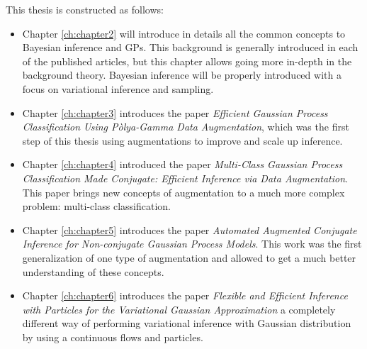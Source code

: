 This thesis is constructed as follows:
\begin{itemize}
    \item Chapter \ref{ch:chapter2} will introduce in details all the common concepts to Bayesian inference and \ac{GPs}.
          This background is generally introduced in each of the published articles, but this chapter allows going more in-depth in the background theory.
          Bayesian inference will be properly introduced with a focus on variational inference and sampling.
    \item Chapter \ref{ch:chapter3} introduces the paper \textit{Efficient Gaussian Process Classification Using P\`olya-Gamma Data Augmentation}, which was the first step of this thesis using augmentations to improve and scale up inference.
    \item Chapter \ref{ch:chapter4} introduced the paper \textit{Multi-Class Gaussian Process Classification Made Conjugate: Efficient Inference via Data Augmentation}.
          This paper brings new concepts of augmentation to a much more complex problem: multi-class classification.
    \item Chapter \ref{ch:chapter5} introduces the paper \textit{Automated Augmented Conjugate Inference for Non-conjugate Gaussian Process Models}.
          This work was the first generalization of one type of augmentation and allowed to get a much better understanding of these concepts.
    \item Chapter \ref{ch:chapter6} introduces the paper \textit{Flexible and Efficient Inference with Particles for the Variational Gaussian Approximation } a completely different way of performing variational inference with Gaussian distribution by using a continuous flows and particles.

\end{itemize}


